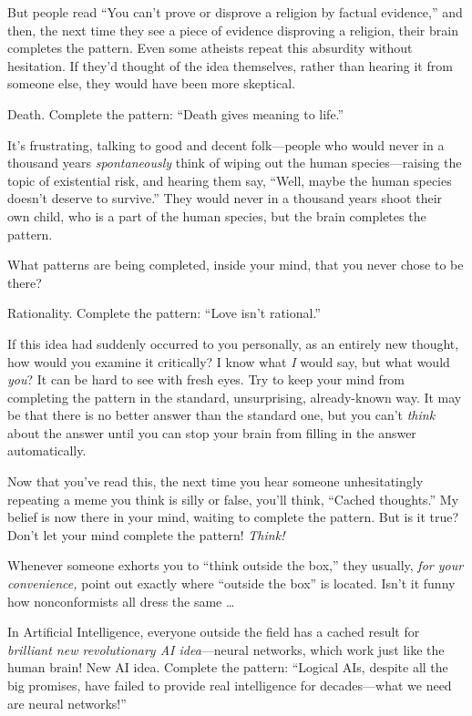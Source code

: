{
 But people read ``You can't prove
or disprove a religion by factual evidence,'' and
then, the next time they see a piece of evidence disproving a religion,
their brain completes the pattern. Even some atheists repeat this
absurdity without hesitation. If they'd thought of the
idea themselves, rather than hearing it from someone else, they would
have been more skeptical.}

{
 Death. Complete the pattern: ``Death gives
meaning to life.''}

{
 It's frustrating, talking to good and decent
folk---people who would never in a thousand years
\textit{spontaneously} think of wiping out the human species---raising
the topic of existential risk, and hearing them say,
``Well, maybe the human species
doesn't deserve to survive.'' They
would never in a thousand years shoot their own child, who is a part of
the human species, but the brain completes the pattern.}

{
 What patterns are being completed, inside your mind, that you
never chose to be there?}

{
 Rationality. Complete the pattern: ``Love
isn't rational.''}

{
 If this idea had suddenly occurred to you personally, as an
entirely new thought, how would you examine it critically? I know what
\textit{I} would say, but what would \textit{you}? It can be hard to
see with fresh eyes. Try to keep your mind from completing the pattern
in the standard, unsurprising, already-known way. It may be that there
is no better answer than the standard one, but you
can't \textit{think} about the answer until you can
stop your brain from filling in the answer automatically.}

{
 Now that you've read this, the next time you hear
someone unhesitatingly repeating a meme you think is silly or false,
you'll think, ``Cached
thoughts.'' My belief is now there in your mind,
waiting to complete the pattern. But is it true? Don't
let your mind complete the pattern! \textit{Think!}}

\myendsectiontext


{
 Whenever someone exhorts you to ``think outside
the box,'' they usually, \textit{for your
convenience,} point out exactly where ``outside the
box'' is located. Isn't it funny how
nonconformists all dress the same \ldots }

{
 In Artificial Intelligence, everyone outside the field has a
cached result for \textit{brilliant new revolutionary AI
idea}{}---neural networks, which work just like the human brain! New AI
idea. Complete the pattern: ``Logical AIs, despite all
the big promises, have failed to provide real intelligence for
decades---what we need are neural networks!''}

